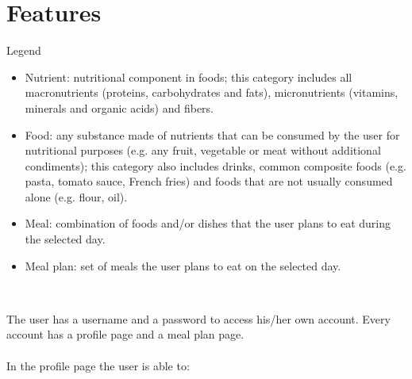 \documentclass{article}
\begin{document}
\section{Features}
\begin{small}
	\textasteriskcentered\textasteriskcentered\textasteriskcentered \space Legend \space \textasteriskcentered\textasteriskcentered\textasteriskcentered\\
	\begin{itemize}
		\renewcommand\labelitemi{{\boldmath$\cdot$}}
		\item Nutrient: nutritional component in foods; this category includes all macronutrients (proteins, carbohydrates and fats), micronutrients (vitamins, minerals and organic acids) and fibers.
		\item Food: any substance made of nutrients that can be consumed by the user for nutritional purposes (e.g. any fruit, vegetable or meat without additional condiments); this category also includes drinks, common composite foods (e.g. pasta, tomato sauce, French fries) and foods that are not usually consumed alone (e.g. flour, oil).
		\item Meal: combination of foods and/or dishes that the user plans to eat during the selected day.
		\item Meal plan: set of meals the user plans to eat on the selected day.\\
	\end{itemize}
	\hspace*{0.5cm}\textasteriskcentered\textasteriskcentered\textasteriskcentered\textasteriskcentered\textasteriskcentered\textasteriskcentered\textasteriskcentered\textasteriskcentered\textasteriskcentered\textasteriskcentered\textasteriskcentered\textasteriskcentered\textasteriskcentered\textasteriskcentered\textasteriskcentered\\
\end{small}

The user has a username and a password to access his/her own account. Every account has a profile page and a meal plan page.\\
\\
In the profile page the user is able to:\\
\end{document}
